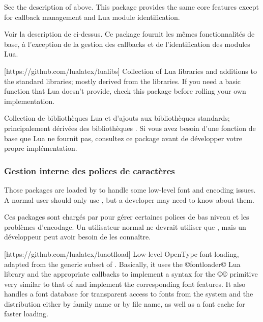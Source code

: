 \documentclass{lltxdoc}
\begin{document}
See the description of  above. This package provides the same
core features except for callback management and Lua module identification.

Voir la description de  ci-dessus. Ce package fournit les mêmes fonctionnalités de base, à l'exception de la gestion des callbacks et de l'identification des modules Lua.

[https://github.com/lualatex/lualibs]
Collection of Lua libraries and additions to the standard libraries; mostly
derived from the \context libraries. If you need a basic function that Lua
doesn't provide, check this package before rolling your own implementation.

Collection de bibliothèques Lua et d'ajouts aux bibliothèques standards; principalement dérivées des bibliothèques \context. Si vous avez besoin d'une fonction de base que Lua ne fournit pas, consultez ce package avant de développer votre propre implémentation.

\subsubsection{Gestion interne des polices de caractères}\label{fontint}

Those packages are loaded by  to handle some low-level font and
encoding issues. A normal user should only use , but a developer
may need to know about them.


Ces packages sont chargés par  pour gérer certaines polices de bas niveau et les problèmes d'encodage. Un utilisateur normal ne devrait utiliser que , mais un développeur peut avoir besoin de les connaître.

[https://github.com/lualatex/luaotfload]
Low-level OpenType font loading, adapted from the generic subset of \context.
Basically, it uses the ©fontloader© Lua library and the appropriate callbacks
to implement a syntax for the ©\font© primitive very similar to that of \xetex
and implement the corresponding font features. It also handles a font database
for transparent access to fonts from the system and the \tex distribution either
by family name or by file name, as well as a font cache for faster loading.
\end{document}
